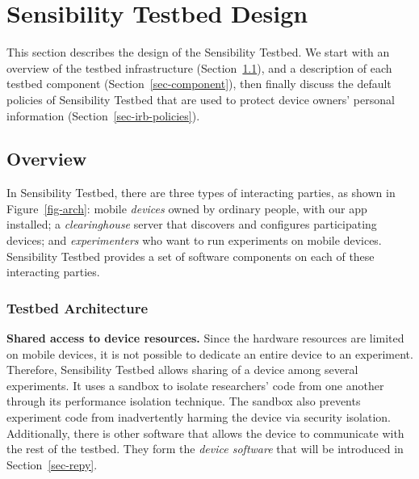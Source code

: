 \section{Sensibility Testbed Design}\label{sec-design}

This section describes the design of the Sensibility Testbed. 
We start with
an overview of the testbed infrastructure (Section~\ref{sec-overview}), 
and a description of each testbed component 
(Section~\ref{sec-component}), then finally discuss the default policies 
of Sensibility Testbed that are used to protect device owners' personal 
information (Section~\ref{sec-irb-policies}).


\subsection{Overview}\label{sec-overview}

In Sensibility Testbed, there are three types of interacting
parties, as shown in Figure~\ref{fig-arch}: mobile \textit{devices} 
owned by ordinary people, with our app installed; a 
\textit{clearinghouse} server that discovers and configures
participating devices; and \textit{experimenters} who want to run
experiments on mobile devices. Sensibility Testbed provides 
a set of software components on each of these interacting
parties.

\subsubsection{Testbed Architecture}

\textbf{Shared access to device resources.} 
Since the hardware resources are limited on mobile devices, it is 
not possible to dedicate an entire device to an experiment. Therefore, 
Sensibility Testbed allows sharing of a device among several 
experiments. It uses a sandbox to isolate researchers' code from 
one another through its performance isolation technique. The sandbox 
also prevents experiment code from inadvertently harming the device
via security isolation. Additionally, there is other software that allows
the device to communicate with the rest of the testbed. They form the
\textit{device software} that will be introduced in Section~\ref{sec-repy}.

